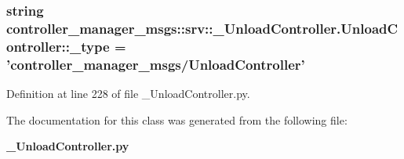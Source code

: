 \subsubsection[{\-\_\-type}]{\setlength{\rightskip}{0pt plus 5cm}string {\bf controller\-\_\-manager\-\_\-msgs\-::srv\-::\-\_\-\-Unload\-Controller.\-Unload\-Controller\-::\-\_\-type} = 'controller\-\_\-manager\-\_\-msgs/{\bf \-Unload\-Controller}'\hspace{0.3cm}{\ttfamily  [static, private]}}\label{classcontroller__manager__msgs_1_1srv_1_1__UnloadController_1_1UnloadController_aeb837580c4901f5faa0e47005d5eabcc}


\-Definition at line 228 of file \-\_\-\-Unload\-Controller.\-py.



\-The documentation for this class was generated from the following file\-:\begin{DoxyCompactItemize}
\item 
{\bf \-\_\-\-Unload\-Controller.\-py}\end{DoxyCompactItemize}

